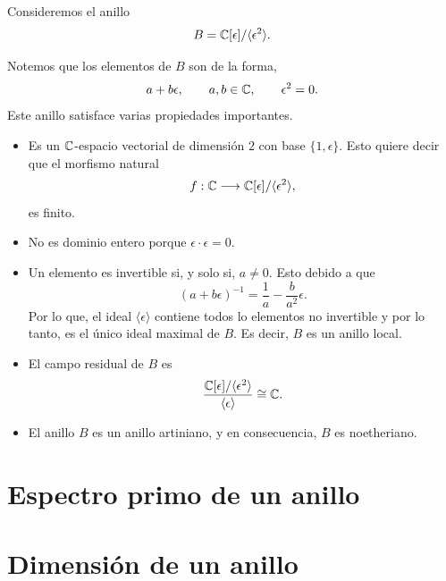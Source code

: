     \begin{example}
    	Consideremos el anillo
    	\begin{equation*}
    		B=\mathbb{C}[\epsilon]/\langle \epsilon^2\rangle.
    	\end{equation*}
   
		Notemos que los elementos de $B$ son de la forma,
    	\begin{equation*}
    		a+b\epsilon,\qquad a,b\in\mathbb{C},\qquad \epsilon^2=0.
    	\end{equation*}
    	Este anillo satisface varias propiedades importantes.
    	\begin{itemize}
    		\item Es un $\mathbb{C}$-espacio vectorial de dimensión $2$ con base $\{1,\epsilon\}$. Esto quiere decir que el morfismo natural
    		\begin{equation*}
    			f:\mathbb{C}\longrightarrow \mathbb{C}[\epsilon]/\langle \epsilon^2\rangle,
    		\end{equation*}
    		es finito.
    		\item No es dominio entero porque $\epsilon\cdot\epsilon=0$.
    		\item Un elemento es invertible si, y solo si, $a\neq 0$. Esto debido a que
    		\begin{equation*}
    			(a+b\epsilon)^{-1}=\frac{1}{a}-\frac{b}{a^2}\epsilon.
    		\end{equation*}
    		Por lo que, el ideal $\langle \epsilon \rangle$ contiene todos lo elementos no invertible y por lo tanto, es el único ideal maximal de $B$. Es decir, $B$ es un anillo local.
    		\item El campo residual de $B$ es
    		\begin{equation*}
    			\frac{\mathbb{C}[\epsilon]/\langle \epsilon^2\rangle}{\langle \epsilon \rangle}\cong\mathbb{C}.
    		\end{equation*}
    		\item El anillo $B$ es un anillo artiniano, y en consecuencia, $B$ es noetheriano.
    	\end{itemize}
    \end{example}
    
    
 \section{Espectro primo de un anillo}
 
 
 \section{Dimensión de un anillo}
    
